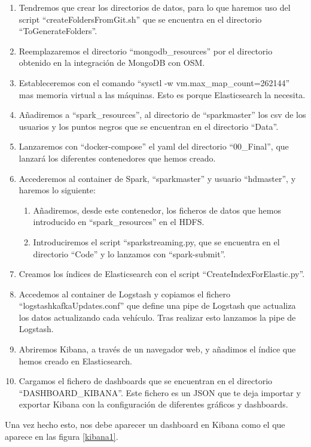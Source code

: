 \begin{enumerate}
\item Tendremos que crear los directorios de datos, para lo que haremos uso del script “createFoldersFromGit.sh” que se encuentra en el directorio “ToGenerateFolders”.
\item Reemplazaremos el directorio “mongodb\_resources” por el directorio obtenido en la integración de MongoDB con OSM.
\item Estableceremos con el comando “sysctl -w vm.max\_map\_count=262144” mas memoria virtual a las máquinas. Esto es porque Elasticsearch la necesita.
\item Añadiremos a “spark\_resources”, al directorio de “sparkmaster”  los csv de los usuarios y los puntos negros que se encuentran en el directorio “Data”.
\item Lanzaremos con “docker-compose” el yaml del directorio “00\_Final”, que lanzará los diferentes contenedores que hemos creado.
\item Accederemos al container de Spark, “sparkmaster” y usuario “hdmaster”, y haremos lo siguiente:
\begin{enumerate}
\item Añadiremos, desde este contenedor, los ficheros de datos que hemos introducido en “spark\_resources” en el HDFS.
\item Introduciremos el script “sparkstreaming.py, que se encuentra en el directorio “Code” y lo lanzamos con “spark-submit”.
\end{enumerate}
\item Creamos los índices de Elasticsearch con el script “CreateIndexForElastic.py”.
\item Accedemos al container de Logstash y copiamos el fichero “logstashkafkaUpdates.conf” que define una pipe de Logstash que actualiza los datos actualizando cada vehículo. Tras realizar esto lanzamos la pipe de Logstash.
\item Abriremos Kibana, a través de un navegador web, y añadimos el índice que hemos creado en Elasticsearch.
\item Cargamos el fichero de dashboards que se encuentran en el directorio “DASHBOARD\_KIBANA”. Este fichero es un JSON que te deja importar y exportar Kibana con la configuración de diferentes gráficos y dashboards.
\end{enumerate}

Una vez hecho esto, nos debe aparecer un dashboard en Kibana como el que aparece en las figura \ref{kibana1}.

